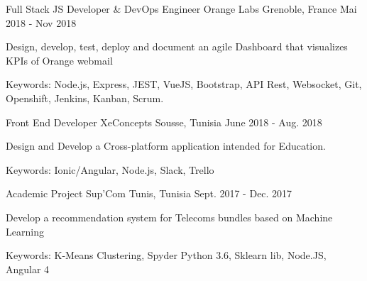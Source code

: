 

\begin{cventries}

  \cventry
    {Full Stack JS Developer \& DevOps Engineer} %
    {Orange Labs} %
    {Grenoble, France} %
    {Mai 2018 - Nov 2018} %
    {
      \begin{cvitems} %
        \item {Design, develop, test, deploy and document an agile Dashboard that visualizes KPIs of Orange webmail}
        \item {Keywords: Node.js, Express, JEST, VueJS, Bootstrap, API Rest, Websocket, Git, Openshift, Jenkins, Kanban, Scrum.}
      \end{cvitems}
    }

  \cventry
    {Front End Developer} %
    {XeConcepts} %
    {Sousse, Tunisia} %
    {June 2018 - Aug. 2018} %
    {
      \begin{cvitems} %
        \item {Design and Develop a Cross-platform application intended for Education.}
        \item {Keywords: Ionic/Angular, Node.js, Slack, Trello}
      \end{cvitems}
    }

  \cventry
    {Academic Project} %
    {Sup'Com} %
    {Tunis, Tunisia} %
    {Sept. 2017 - Dec. 2017} %
    {
      \begin{cvitems} %
        \item {Develop a recommendation system for Telecoms bundles based on Machine Learning }
        \item {Keywords: K-Means Clustering, Spyder Python 3.6, Sklearn lib, Node.JS, Angular 4}
      \end{cvitems}
    }


\end{cventries}
